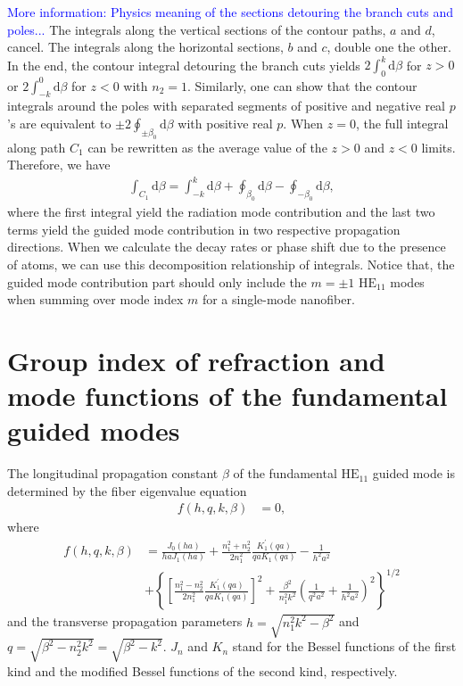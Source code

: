 \documentclass[preprint,aps,pra,onecolumn]{revtex4-1} %
\begin{document}
\textcolor{blue}{More information: Physics meaning of the sections detouring the branch cuts and poles...} The integrals along the vertical sections of the contour paths, $ a $ and $ d $, cancel. The integrals along the horizontal sections, $ b $ and $ c $, double one the other. In the end, the contour integral detouring the branch cuts yields $ 2\int_0^k\mathrm{d}\beta $ for $ z>0 $ or $ 2\int_{-k}^0\mathrm{d}\beta $ for $ z<0 $ with $ n_2=1 $. Similarly, one can show that the contour integrals around the poles with separated segments of positive and negative real $ p $'s are equivalent to $ \pm 2\oint_{\pm \beta_0}\!\!\mathrm{d}\beta $ with positive real $ p $. When $ z=0 $, the full integral along path $ C_1 $ can be rewritten as the average value of the $ z>0 $ and $ z<0 $ limits. Therefore, we have 
\begin{align}
\int_{C_1}\mathrm{d}\beta =\int_{-k}^k\mathrm{d}\beta +\oint_{\beta_0}\mathrm{d}\beta -\oint_{-\beta_0}\!\!\mathrm{d}\beta,
\end{align}
where the first integral yield the radiation mode contribution and the last two terms yield the guided mode contribution in two respective propagation directions. When we calculate the decay rates or phase shift due to the presence of atoms, we can use this decomposition relationship of integrals. Notice that, the guided mode contribution part should only include the $ m=\pm 1 $ $\mathrm{HE}_{11}$ modes when summing over mode index $ m $ for a single-mode nanofiber. 



\section{Group index of refraction and mode functions of the fundamental guided modes}
The longitudinal propagation constant $\beta$ of the fundamental $\mathrm{HE}_{11}$ guided mode is determined by the fiber eigenvalue equation~\cite{LeKien2005}
\begin{align}
f(h,q,k,\beta) &=0,
\end{align}
where
\begin{align}
f(h,q,k,\beta) &=\frac{J_0(ha)}{haJ_1(ha)}+\frac{n_1^2+n_2^2}{2n_1^2}\frac{K_1^\prime(qa)}{qaK_1(qa)}-\frac{1}{h^2a^2} \\
&+\left\{\left[\frac{n_1^2-n_2^2}{2n_1^2}\frac{K_1^\prime(qa)}{qaK_1(qa)} \right]^2 +\frac{\beta^2}{n_1^2k^2}\left(\frac{1}{q^2a^2}+\frac{1}{h^2a^2} \right)^2 \right\}^{1/2}
\end{align}
and the transverse propagation parameters $h=\sqrt{n_1^2k^2-\beta^2}$ and $q=\sqrt{\beta^2-n_2^2k^2}=\sqrt{\beta^2-k^2}$. $J_n$ and $K_n$ stand for the Bessel functions of the first kind and the modified Bessel functions of the second kind, respectively. 
\end{document}
